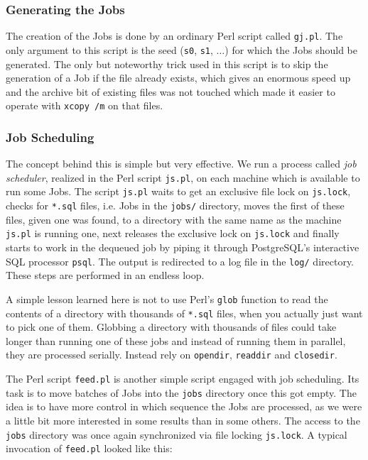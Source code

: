 \subsubsection{Generating the Jobs}
\label{sec:generatejobs}
The creation of the Jobs is done by an ordinary Perl script called
\texttt{gj.pl}.  The only argument to this script is the seed
(\texttt{s0}, \texttt{s1}, $\ldots$) for which the Jobs should be
generated. The only but noteworthy trick used in this script is to
skip the generation of a Job if the file already exists, which gives an
enormous speed up and the archive bit of existing files was not
touched which made it easier to operate with \texttt{xcopy /m} on that
files. 

\subsubsection{Job Scheduling}
\label{sec:jobscheduling}
The concept behind this
is simple but very effective.  We run a process called \emph{job
scheduler}, realized in the Perl script \texttt{js.pl}, on each
machine which is available to run some Jobs. The script \texttt{js.pl}
waits to get an exclusive file lock on \texttt{js.lock}, checks for
\texttt{*.sql} files, i.e. Jobs in the \texttt{jobs/} directory, moves
the first of these files, given one was found, to a directory with the
same name as the machine \texttt{js.pl} is running one, next releases
the exclusive lock on \texttt{js.lock} and finally starts to work in
the dequeued job by piping it through PostgreSQL's interactive SQL
processor \texttt{psql}. The output is redirected to a log file in the
\texttt{log/} directory.  These steps are performed in an endless loop.

A simple lesson learned here is not to use Perl's \texttt{glob}
function to read the contents of a directory with thousands of
\texttt{*.sql} files, when you actually just want to pick one of
them. Globbing a directory with thousands of files could take longer
than running one of these jobs and instead of running them in
parallel, they are processed serially.  Instead rely on \texttt{opendir},
\texttt{readdir} and \texttt{closedir}.

The Perl script \texttt{feed.pl} is another simple script engaged with
job scheduling.  Its task is to move batches of Jobs into the
\texttt{jobs} directory once this got empty.  The idea is to have
more control in which sequence the Jobs are processed, as we were a
little bit more interested in some results than in some others.  The
access to the \texttt{jobs} directory was once again synchronized via
file locking \texttt{js.lock}.  A typical invocation of
\texttt{feed.pl} looked like this:

